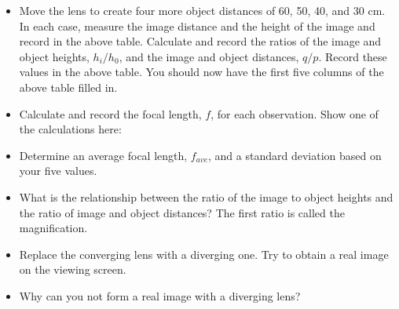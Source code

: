 \begin{itemize}
\item Move the lens to create four more object distances of 60, 50, 40, and 30 cm. In each case, measure the image distance and the height of the image and record in the above table. Calculate and record the ratios of the image and object heights, $h_i / h_0$, and the image and object distances, $q / p$. Record these values in the above table. You should now have the first five columns of the above table filled in.
\item Calculate and record the focal length, $f$, for each observation. Show one of the calculations here:\vspace{15mm}
\item Determine an average focal length, $f_{ave}$, and a standard
deviation based on your five values.\vspace{15mm}
\item What is the relationship between the ratio of the image to object
heights and the ratio of image and object distances? The first ratio
is called the magnification.\vspace{15mm}

\item Replace the converging lens with a diverging one. Try to obtain a
real image on the viewing screen.
\item Why can you not form a real image with a diverging lens?\vspace{15mm}

\end{itemize}



